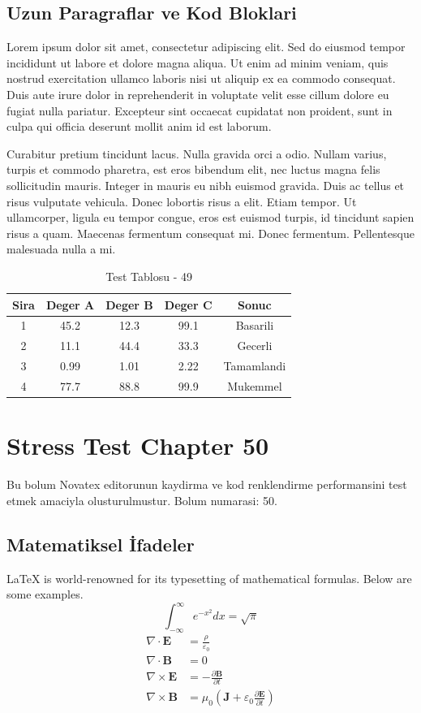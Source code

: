 \documentclass[12pt,a4paper]{article}
\begin{document}
\subsection{Uzun Paragraflar ve Kod Bloklari}
Lorem ipsum dolor sit amet, consectetur adipiscing elit. Sed do eiusmod tempor incididunt ut labore et dolore magna aliqua. Ut enim ad minim veniam, quis nostrud exercitation ullamco laboris nisi ut aliquip ex ea commodo consequat. Duis aute irure dolor in reprehenderit in voluptate velit esse cillum dolore eu fugiat nulla pariatur. Excepteur sint occaecat cupidatat non proident, sunt in culpa qui officia deserunt mollit anim id est laborum.

Curabitur pretium tincidunt lacus. Nulla gravida orci a odio. Nullam varius, turpis et commodo pharetra, est eros bibendum elit, nec luctus magna felis sollicitudin mauris. Integer in mauris eu nibh euismod gravida. Duis ac tellus et risus vulputate vehicula. Donec lobortis risus a elit. Etiam tempor. Ut ullamcorper, ligula eu tempor congue, eros est euismod turpis, id tincidunt sapien risus a quam. Maecenas fermentum consequat mi. Donec fermentum. Pellentesque malesuada nulla a mi.

\begin{table}[h!]
\centering
\begin{tabular}{|c|c|c|c|c|}
\hline
\textbf{Sira} & \textbf{Deger A} & \textbf{Deger B} & \textbf{Deger C} & \textbf{Sonuc} \\
\hline
1 & 45.2 & 12.3 & 99.1 & Basarili \\
2 & 11.1 & 44.4 & 33.3 & Gecerli \\
3 & 0.99 & 1.01 & 2.22 & Tamamlandi \\
4 & 77.7 & 88.8 & 99.9 & Mukemmel \\
\hline
\end{tabular}
\caption{Test Tablosu - 49}
\end{table}

\newpage
\section{Stress Test Chapter 50}
Bu bolum Novatex editorunun kaydirma ve kod renklendirme performansini test etmek amaciyla olusturulmustur. Bolum numarasi: 50.

\subsection{Matematiksel İfadeler}
\LaTeX{} is world-renowned for its typesetting of mathematical formulas. Below are some examples.
\begin{equation}
\int_{-\infty}^{\infty} e^{-x^2} dx = \sqrt{\pi}
\end{equation}
\begin{align}
\nabla \cdot \mathbf{E} &= \frac{\rho}{\varepsilon_0} \\
\nabla \cdot \mathbf{B} &= 0 \\
\nabla \times \mathbf{E} &= -\frac{\partial \mathbf{B}}{\partial t} \\
\nabla \times \mathbf{B} &= \mu_0\left(\mathbf{J} + \varepsilon_0 \frac{\partial \mathbf{E}}{\partial t}\right)
\end{align}
\end{document}
